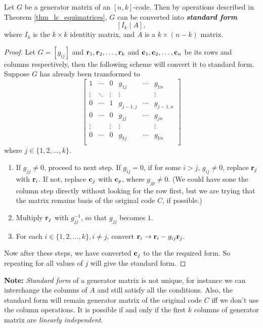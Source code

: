 \documentclass[../main.tex]{subfiles}
\begin{document}
\begin{thm}
	Let $G$ be a generator matrix of an $[n,k]$-code. Then by operations described in Theorem \ref{thm_lc_equimatrices}, $G$ can be converted into \textbf{\emph{standard form}}
	\[
		[I_k\;|\;A],
	\]
	where $I_k$ is the $k\times k$ identitiy matrix, and $A$ is a $k\times (n-k)$ matrix.
\end{thm}
\begin{proof}
	Let $G=[g_{ij}]$ and $\textbf{r}_1,\textbf{r}_2,\ldots,\textbf{r}_k$ and $\textbf{c}_1,\textbf{c}_2,\ldots,\textbf{c}_n$ be its rows and columns respectively, then the following scheme will convert it to standard form.\\
	Suppose $G$ has already been transformed to
	\[
		\begin{bmatrix}
			1 & \cdots & 0 & g_{1j} & \cdots & g_{1n}\\
			\vdots & \ddots & \vdots & \vdots & & \vdots\\
			0 & \cdots & 1 & g_{j-1,j} & \cdots &g_{j-1,n}\\
			0 & \cdots & 0 & g_{jj} & \cdots & g_{jn}\\
			\vdots &  & \vdots & \vdots &  & \vdots\\
			0 & \cdots & 0 & g_{kj} & \cdots & g_{kn}\\
		\end{bmatrix}
	\]
	where $j\in \{1,2,\ldots,k\}$.\\
	\begin{enumerate}
	\itemsep-1mm
		\item If $g_{jj}\neq 0$, proceed to next step. If $g_{ij}=0$, if for some $i>j$, $g_{ij}\neq 0$, replace $\textbf{r}_j$ with $\textbf{r}_i$. If not, replace $\textbf{c}_j$ with $\textbf{c}_p$, where $g_{jp}\neq 0$. (We could have sone the column step directly without looking for the row first, but we are trying that the matrix remains basis of the original code $C$, if possible.)
		\item Multiply $\textbf{r}_{j}$ with $g_{jj}^{-1}$, so that $g_{jj}$ becomes $1$.
		\item For each $i\in \{1,2,\ldots,k\}, i\neq j$, convert $\textbf{r}_i\rightarrow \textbf{r}_i-g_{ij}\textbf{r}_j$.
	\end{enumerate}
	Now after these steps, we have converted $\textbf{c}_j$ to the the required form. So repeating for all values of $j$ will give the standard form. 	 
\end{proof}
\textbf{Note:} \emph{Standard form} of a generator matrix is not unique, for instance we can interchange the columns of $A$ and still satisfy all the conditions. Also, the standard form will remain generator matrix of the original code $C$ iff we don't use the column operations. It is possible if and only if the first $k$ columns of generator matrix are \emph{linearly independent}. 
\end{document}
